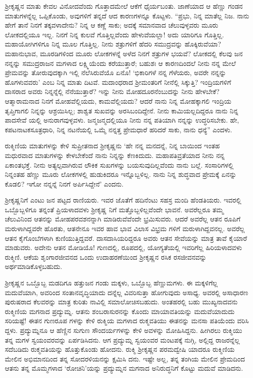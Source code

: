 ಶ್ರೀಕೃಷ್ಣನ ಮಾತು ಕೇವಲ ವಿನೋದವೆಂದು ಗೊತ್ತಾದಮೇಲೆ ಆಕೆಗೆ ಧೈರ್ಯಬಂತು. ಜಾಣೆಯಾದ ಆ ಹೆಣ್ಣು ಗಂಡನ ಮಾತುಗಳನ್ನೆಲ್ಲ ಒಪ್ಪಿಕೊಂಡು, ಅವುಗಳಿಗೆ ತನ್ನದೆ ಆದ ಕಾರಣಗಳನ್ನೂ ಕೊಟ್ಟಳು. “ಪ್ರಭು, ನಿನ್ನ ಮಾತೆಲ್ಲ ನಿಜ. ನಾನು ಹೇಗೆ ತಾನೆ ನಿನಗೆ ತಕ್ಕವಳಾದೇನು? ನಿನ್ನ ಆ ಕಣ್ಣೆ ಸಾಕು; ಅದಕ್ಕೆ ಸಮಾನವಾದ ಚೆಲುವುಳ್ಳವರು ಮೂರು ಲೋಕದಲ್ಲಿಯೂ ಇಲ್ಲ. ನಿನಗೆ ನಿನ್ನ ಕುಲವೆ ಗೊತ್ತಿಲ್ಲವೆಂದು ಹೇಳುವೆಯಲ್ಲಾ! ಅದು ಯಾರಿಗೂ ಗೊತ್ತಿಲ್ಲ. ಮಹಾಯೋಗಿಗಳಿಗೂ ನಿನ್ನ ಮೂಲ ಗೊತ್ತಿಲ್ಲ. ನೀನು ಶತ್ರುಗಳಿಗೆ ಹೆದರಿ ಸಮುದ್ರವನ್ನು ಹೊಕ್ಕಿರುವೆಯಾ? ಮಹಾನುಭಾವ, ಮೂರಡಿಗಳಿಂದ ಮೂರು ಲೋಕಗಳನ್ನೆ ಅಳೆದ ನಿನಗೆ ಶತ್ರುಗಳ ಭಯವೆ? ಲೋಕದಲ್ಲಿ ಕೆಲವು ಜನ ನನ್ನನ್ನು ಸಮುದ್ರರಾಜನ ಮಗಳಾದ ಲಕ್ಷ್ಮಿಯೆಂದು ಕರೆಯುತ್ತಾರೆ; ಬಹುಶಃ ಆ ಕಾರಣದಿಂದಲೆ ನೀನು ನನ್ನ ಮೇಲೆ ಪ್ರೇಮವನ್ನು ತೋರುವುದಕ್ಕಾಗಿ ಇಲ್ಲಿ ನೆಲೆಸಿರುವೆಯೊ ಏನೊ! ‘ಭಿಕಾರಿಗಳೆ ನನ್ನ ಗೆಳೆಯರು, ಅವರೇ ನನ್ನನ್ನು ಹೊಗಳುವವರು’ ಎಂಬ ನಿನ್ನ ಮಾತು ದಿಟವೆ. ಮದಾಂಧರಾದ ಶ್ರೀಮಂತರಿಗೆ ನೀನೆಲ್ಲಿ ಸಿಕ್ಕುತ್ತಿ? ಇಂದ್ರಿಯಗಳಿಗೆ ದಾಸರಾದ ಅವರು ನಿನ್ನನ್ನೆಲ್ಲಿ ನೆನೆಯುತ್ತಾರೆ? ಇನ್ನು ನೀನು ಮೋಹದೂರನೆಂಬುದನ್ನು ನೀನು ಹೇಳಬೇಕೆ? ಆತ್ಮಾರಾಮನಾದ ನಿನಗೆ ಮೋಹವೆಲ್ಲಿಯದು, ಕಾಮವೆಲ್ಲಿಯದು? ಆದರೆ ನಾನು ನಿನ್ನ ಮೋಹಕ್ಕಾಗಲಿ ಇಂದ್ರಿಯ ತೃಪ್ತಿಗಾಗಲಿ ನಿನ್ನನ್ನು ಆಶ್ರಯಿಸಿಲ್ಲ; ಶಾಶ್ವತ ಸುಖವನ್ನು ಅರಸಿಬಂದಿದ್ದೇನೆ. ನೀನು ಕಾಮಿಯಲ್ಲದಿದ್ದರೂ ನಾನು ನಿನ್ನ ಪಾದಸೇವೆ ಯಲ್ಲಿ ಅನುರಾಗವುಳ್ಳವಳು. ಜನ್ಮಜನ್ಮದಲ್ಲಿಯೂ ನೀನು ನನ್ನ ಪತಿಯಾಗಿ ನನ್ನನ್ನು ಉದ್ಧರಿಸಬೇಕು. ಹೇ, ಕಪಟನಾಟಕಸೂತ್ರಧಾರಿ, ನಿನ್ನ ನಟನೆಯಲ್ಲಿ ಒಮ್ಮೆ ನನ್ನತ್ತ ಪ್ರೇಮಧಾರೆ ಹರಿದರೆ ಸಾಕು, ನಾನು ಧನ್ಯೆ” ಎಂದಳು.

ರುಕ್ಮಿಣಿಯ ಮಾತುಗಳನ್ನು ಕೇಳಿ ಸುಪ್ರೀತನಾದ ಶ್ರೀಕೃಷ್ಣನು ‘ಹೇ ನನ್ನ ಮನದನ್ನೆ, ನಿನ್ನ ಬಾಯಿಂದ ಇಂತಹ ಮಧುರವಾದ ಮಾತುಗಳನ್ನು ಕೇಳಬೇಕೆಂದೆ ನಾನು ನಿನ್ನನ್ನು ಕೆಣಕಿದುದು. ಮಹಾಪತಿವ್ರತೆಯಾದ ನೀನು ನನ್ನ ಏಕಾಂತಭಕ್ತೆ. ನೀನು ಅತ್ಯಲ್ಪವಾಗಿರುವ ಲೌಕಿಕ ಸುಖಗಳನ್ನು ಬಯಸುವುದಿಲ್ಲವೆಂದು ನಾನು ಬಲ್ಲೆ. ಸಂಸಾರಿಗಳಲ್ಲಿ ನಿನ್ನಂತಹ ಹೆಣ್ಣು ಮೂರು ಲೋಕಗಳಲ್ಲಿ ಹುಡುಕಿದರೂ ಇನ್ನೊಬ್ಬಳಿಲ್ಲ. ನಾನು ನಿನ್ನ ಶುದ್ಧವಾದ ಪ್ರೇಮಕ್ಕೆ ಏನನ್ನು ಕೊಡಲಿ? ಇಗೋ ನನ್ನನ್ನೆ ನಿನಗೆ ಅರ್ಪಿಸಿದ್ದೇನೆ’ ಎಂದನು.

ಶ್ರೀಕೃಷ್ಣನಿಗೆ ಎಂಟು ಜನ ಪಟ್ಟದ ರಾಣಿಯರು. ಇವರ ಜೊತೆಗೆ ಹದಿನೆಂಟು ಸಹಸ್ರ ಮಂದಿ ಹೆಂಡತಿಯರು. ಇವರಲ್ಲಿ ಒಬ್ಬೊಬ್ಬಳಿಗೂ ತನ್ನಂತೆ ಪ್ರಿಯಳಾದವಳು ಶ್ರೀಕೃಷ್ಣ ನಿಗೆ ಮತ್ತೊಬ್ಬಳಿಲ್ಲವೆಂದೇ ಭಾವನೆ. ಅವರೆಲ್ಲರೂ ತಮ್ಮ ಚೆಲುವಿನಿಂದ ಆತನನ್ನು ಮೋಹಪರವಶನನ್ನಾಗಿ ಮಾಡಿರುವೆವೆಂದೇ ಭ್ರಮಿಸುವರು. ಆದರೆ ಅವರೆಲ್ಲ ಆತನ ರೂಪಿಗೆ ಮರುಳಾಗಿದ್ದವರೇ ಹೊರತು, ಆತನೇನೂ ಇವರ ಹಾವ ಭಾವ ವಿಲಾಸ ವಿಭ್ರಮ ಗಳಿಗೆ ಮರುಳಾಗಿದ್ದವನಲ್ಲ. ಅವರೆಲ್ಲ ಆತನ ಕೈಗೊಂಬೆಗಳಾಗಿ ಕುಣಿಯುತ್ತಿದ್ದವರೆ. ದಾಸದಾಸಿಯರಿದ್ದರೂ ಅವರು ಆತನ ಸೇವೆಯನ್ನು ಮಾತ್ರ ತಾವೆ ಕೈಯಾರೆ ಮಾಡುವರು. ಅದೇನು ಆತನ ಮೋಡಿಯೊ! ಗುಣದಲ್ಲಿ, ರೂಪದಲ್ಲಿ, ಯೋಗ್ಯತೆಯಲ್ಲಿ ಇವರಿಗೆಲ್ಲ ಹಿರಿಯಳಾದವಳು ರುಕ್ಮಿಣಿ. ಆಕೆಯ ಶೃಂಗಾರಜೀವನದ ಒಂದು ಉದಾಹರಣೆಯಿಂದ ಶ್ರೀಕೃಷ್ಣನ ರಸಿಕ ರಸಜೀವನವನ್ನು ಅರ್ಥಮಾಡಿಕೊಳ್ಳಬಹುದು.

ಶ್ರೀಕೃಷ್ಣನ ಒಬ್ಬೊಬ್ಬ ಮಡದಿಗೂ ಹತ್ತುಜನ ಗಂಡು ಮಕ್ಕಳು, ಒಬ್ಬೊಬ್ಬ ಹೆಣ್ಣುಮಗಳು. ಈ ಮಕ್ಕಳಿಗೆಲ್ಲ ಮದುವೆಯಾಗಿ, ಅವರಿಂದ ಸಂತಾನವೃದ್ಧಿಯಾದು ದನ್ನೆಲ್ಲ ವಿವರಿಸುತ್ತಾ ಹೋಗುವುದು ಅಸಾಧ್ಯ. ಅವರಲ್ಲಿ ಅಸಾಧಾರಣ ಪುರುಷರಾದ ಕೆಲವರನ್ನು ಮಾತ್ರ ಕುರಿತು ನಾವಿಲ್ಲಿ ಸಮಾಲೋಚಿಸಬಹುದು. ಅಂತಹರಲ್ಲಿ ಬಹು ಮುಖ್ಯನಾದವನು ರುಕ್ಮಿಣಿಯ ಮಗನಾದ ಪ್ರದ್ಯುಮ್ನ. ಆತನು ಶಂಬರಾಸುರನನ್ನು ಕೊಂದು ಮಾಯಾವತಿಯನ್ನು ಮದುವೆಯಾದುದು ಸರಿಯಷ್ಟೆ! ಈತನ ಗುಣರೂಪ ಗಳನ್ನು ಕೇಳಿ ರುಕ್ಮಿಯ ಮಗಳಾದ ರುಕ್ಮವತಿಯು ಈತನನ್ನು ಮನಸಾ ಪತಿಯೆಂದು ವರಿಸಿ ದ್ದಳು. ಪ್ರದ್ಯುಮ್ನನೂ ಆ ಹೆಣ್ಣಿನ ಸುಗುಣ ಸೌಂದರ್ಯಗಳನ್ನು ಕೇಳಿ ಅವಳನ್ನು ಮೋಹಿಸಿದ್ದನು. ಹೀಗಿರಲು ರುಕ್ಮಿಯು ತನ್ನ ಮಗಳ ಸ್ವಯಂವರವನ್ನು ಏರ್ಪಡಿಸಿದನು. ಆಗ ಪ್ರದ್ಯುಮ್ನ ಸ್ವಯಂವರ ಮಂಟಪಕ್ಕೆ ನುಗ್ಗಿ, ಅಲ್ಲಿದ್ದ ರಾಜರನ್ನೆಲ್ಲ ಸದೆಬಡಿದು ರುಕ್ಮವತಿಯನ್ನು ಹೊತ್ತುಕೊಂಡು ಹೋದನು. ರುಕ್ಮಿ ಶ್ರೀಕೃಷ್ಣನ ಪರಮದ್ವೇಷಿ ಯಾದರೂ ರುಕ್ಮಿಣಿಯ ಮೇಲಿನ ಅಭಿಮಾನದಿಂದ ತನ್ನ ಸೋದರಳಿಯನನ್ನು ಕ್ಷಮಿಸಿ ದನು. ಇಷ್ಟೇ ಅಲ್ಲ, ತನ್ನ ತಂಗಿಯ ಮೇಲಿನ ಪ್ರೇಮದಿಂದ ಆತನು ತನ್ನ ಮೊಮ್ಮಗಳಾದ ‘ರೋಚಿನಿ’ಯನ್ನು ಪ್ರದ್ಯುಮ್ನನ ಮಗನಾದ ಅನಿರುದ್ಧನಿಗೆ ಕೊಟ್ಟು ಮದುವೆ ಮಾಡಿದನು.

